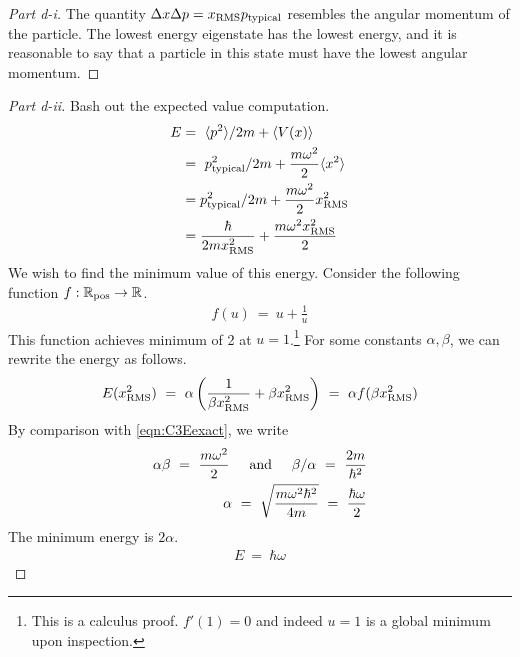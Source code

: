 \documentclass{article}
\numberwithin{equation}{section}
\def\<{{\langle}}
\def\>{{\rangle}}
\newcommand{\textAnd}{
    {
        \hspace{5mm}
        \textrm{and}
        \hspace{5mm}
    }
}
\newcommand{\RR}{\mathbb{R}}
\begin{document}
\begin{proof}
    [Part d-i]
    The quantity $\Delta x \Delta p = x_{\rm RMS} p_{\rm typical}$ 
    resembles the angular momentum of the particle. The lowest 
    energy eigenstate has the lowest energy, and it is reasonable to say 
    that a particle in this state must have the lowest angular momentum. 
\end{proof}
\begin{proof}
    [Part d-ii] Bash out the expected value computation. 
    \begin{align}
        E & = \ \<p^2\>/2m + \<V(x)\> \\
        & = \ p_{\rm typical}^2/2m + \frac {m \omega^2} 2\<x^2\> \\ 
        & = 
            p_{\rm typical}^2/2m + \frac {m \omega^2} 2x_{\rm RMS}^2 \\\label{eqn:C3Eexact}
        & = 
        \frac \hbar {2m x_{\rm RMS}^2} + \frac {m \omega^2 x_{\rm RMS}^2} 2 
    \end{align}
    We wish to find the minimum value of this energy. Consider the 
    following function $f:\RR_{\rm pos} \rightarrow \RR$. 
    \begin{align}
        f(u) \ = \ u + \frac 1 u 
    \end{align}
    This function achieves minimum of 2 at $u = 1$.\footnote{
        This is a calculus proof. $f'(1) = 0$ and indeed $u = 1$ 
        is a global minimum upon inspection. 
    }
    For some constants $\alpha, \beta$, we can rewrite the energy as 
    follows. 
    \begin{align}
        E(x_{\rm RMS}^2) \ = \ \alpha\left(
            \frac 1 {\beta x_{\rm RMS}^2 } + \beta x_{\rm RMS}^2 \right)\ = 
            \ \alpha f(\beta x_{\rm RMS}^2)
    \end{align}
    By comparison with \eqref{eqn:C3Eexact}, we write 
    \begin{align}
        \alpha \beta \ = \ \frac {m \omega^2} 2 \textAnd \beta / \alpha \ = \ \frac{2m} {\hbar^2} \\ 
        \alpha \ = \ \sqrt{\frac {m \omega^2 \hbar^2}{4m}} \ = \ \frac {\hbar\omega} 2
    \end{align}
    The minimum energy is $2\alpha$. 
    \begin{align}
        \boxed{
            E \ = \ \hbar \omega
        }
    \end{align}
    
\end{proof}
\end{document}

